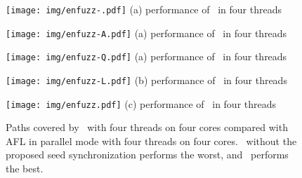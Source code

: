 \begin{figure*}[!htb]
\centering
\begin{minipage}[!htbp]{0.19\textwidth}
     \centering
     \texttt{[image: img/enfuzz-.pdf]}     
     \small{(a)  performance of \toolFour ~in four threads}
\end{minipage}
\begin{minipage}[!htbp]{0.19\textwidth}
     \centering
     \texttt{[image: img/enfuzz-A.pdf]}     
     \small{(a)  performance of \toolOne ~in four threads}
\end{minipage}
\begin{minipage}[!htbp]{0.19\textwidth}
     \centering
     \texttt{[image: img/enfuzz-Q.pdf]}     
     \small{(a)  performance of \toolFive ~in four threads}
\end{minipage}
\begin{minipage}[!htbp]{0.19\textwidth}
     \centering
     \texttt{[image: img/enfuzz-L.pdf]}     
     \small{(b) performance of \toolTwo ~in four threads}
\end{minipage}
\begin{minipage}[!htbp]{0.19\textwidth}
     \centering
     \texttt{[image: img/enfuzz.pdf]}     
     \small{(c) performance of \toolThree ~in four threads}
\end{minipage}
\caption{Paths covered by \EnFuzz ~with four threads on four cores compared with AFL in parallel mode with four threads on four cores. \toolFour ~without the proposed seed synchronization performs the worst, and \EnFuzz ~performs the best.}
\label{fig:paths executed by EnFuzz}
\end{figure*}



